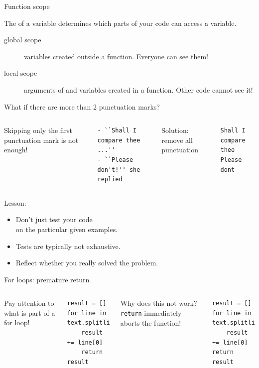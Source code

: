 \documentclass[aspectratio=169,usenames,dvipsnames]{beamer}
\begin{document}
\begin{frame}[fragile]{Function scope}
    \begin{definition}
        The  of a variable determines
            which parts of your code can access a variable.
    \end{definition}
    \begin{description}
        \item[global scope]
            variables created outside a function.
            Everyone can see them!
        \item[local scope]
            arguments of and variables created in a function.
            Other code cannot see it!
    \end{description}
\end{frame}


\begin{frame}[fragile]{What if there are more than 2 punctuation marks?}
    \begin{columns}[T]
Skipping only the first punctuation mark is not enough!
\begin{lstlisting}[style=plain]
- ``Shall I compare thee ...''
- ``Please don't!'' she replied
\end{lstlisting} %
\pause{}
Solution: remove all punctuation
\begin{lstlisting}[style=plain]
Shall I compare thee
Please dont
\end{lstlisting}
\end{columns}
Lesson:
    \begin{itemize}
        \item Don't just test your code \\
            on the particular given examples.
        \item Tests are typically not exhaustive.
        \item Reflect whether you really solved the problem.
    \end{itemize}
\end{frame}

\begin{frame}[fragile]{For loops: premature return}
\begin{columns}
Pay attention to what is part of a for loop!
\begin{lstlisting}
result = []
for line in text.splitlines():
    result += line[0]
    return result
\end{lstlisting}
Why does this not work?
\pause{}
\texttt{return} immediately aborts the function!
\begin{lstlisting}
result = []
for line in text.splitlines():
    result += line[0]
return result
\end{lstlisting}
\end{columns}
\end{frame}
\end{document}
